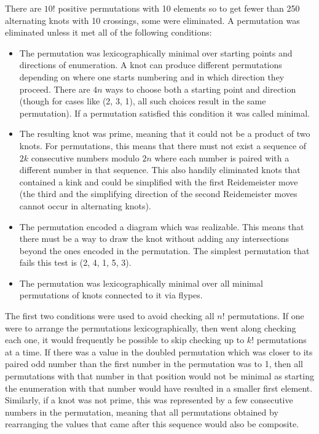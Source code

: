 \begin{paper}
There are $10!$ positive permutations with 10 elements so to get fewer than 250
alternating knots with 10 crossings, some were eliminated.
A permutation was eliminated unless it met all of the following conditions:
\begin{itemize}
\item The permutation was lexicographically minimal over starting points and
directions of enumeration.
A knot can produce different permutations depending on where one starts
numbering and in which direction they proceed.
There are $4n$ ways to choose both a starting point and direction (though for
cases like (2, 3, 1), all such choices result in the same permutation).
If a permutation satisfied this condition it was called minimal.
\item The resulting knot was prime, meaning that it could not be a product of
two knots.
For permutations, this means that there must not exist a sequence of $2k$
consecutive numbers modulo $2n$ where each number is paired with a different
number in that sequence.
This also handily eliminated knots that contained a kink and could be simplified
with the first Reidemeister move (the third and the simplifying direction of the
second Reidemeister moves cannot occur in alternating knots).
\item The permutation encoded a diagram which was realizable.
This means that there must be a way to draw the knot without adding any
intersections beyond the ones encoded in the permutation.
The simplest permutation that fails this test is (2, 4, 1, 5, 3).
\item The permutation was lexicographically minimal over all minimal
permutations of knots connected to it via flypes.
\end{itemize}

The first two conditions were used to avoid checking all $n!$ permutations.
If one were to arrange the permutations lexicographically, then went along
checking each one, it would frequently be possible to skip checking up to $k!$
permutations at a time.
If there was a value in the doubled permutation which was closer to its paired
odd number than the first number in the permutation was to 1, then all
permutations with that number in that position would not be minimal as starting
the enumeration with that number would have resulted in a smaller first element.
Similarly, if a knot was not prime, this was represented by a few consecutive
numbers in the permutation, meaning that all permutations obtained by
rearranging the values that came after this sequence would also be composite.


\end{paper}
